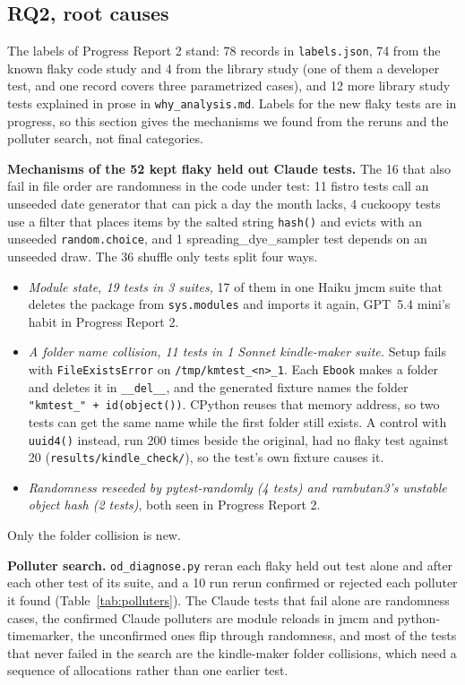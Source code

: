 \subsection{RQ2, root causes}
\label{sec:rootcause3}
The labels of Progress Report 2 stand: 78 records in \texttt{labels.json}, 74 from the known flaky code study and 4 from the library study (one of them a developer test, and one record covers three parametrized cases), and 12 more library study tests explained in prose in \texttt{why\_analysis.md}. Labels for the new flaky tests are in progress, so this section gives the mechanisms we found from the reruns and the polluter search, not final categories.

\textbf{Mechanisms of the 52 kept flaky held out Claude tests.} The 16 that also fail in file order are randomness in the code under test: 11 fistro tests call an unseeded date generator that can pick a day the month lacks, 4 cuckoopy tests use a filter that places items by the salted string \texttt{hash()} and evicts with an unseeded \texttt{random.choice}, and 1 spreading\_dye\_sampler test depends on an unseeded draw. The 36 shuffle only tests split four ways.
\begin{itemize}
\item \emph{Module state, 19 tests in 3 suites,} 17 of them in one Haiku jmcm suite that deletes the package from \texttt{sys.modules} and imports it again, GPT~5.4 mini's habit in Progress Report 2.
\item \emph{A folder name collision, 11 tests in 1 Sonnet kindle-maker suite.} Setup fails with \texttt{FileExistsError} on \texttt{/tmp/kmtest\_<n>\_1}. Each \texttt{Ebook} makes a folder and deletes it in \texttt{\_\_del\_\_}, and the generated fixture names the folder \texttt{"kmtest\_" + id(object())}. CPython reuses that memory address, so two tests can get the same name while the first folder still exists. A control with \texttt{uuid4()} instead, run 200 times beside the original, had no flaky test against 20 (\texttt{results/kindle\_check/}), so the test's own fixture causes it.
\item \emph{Randomness reseeded by pytest-randomly (4 tests) and rambutan3's unstable object hash (2 tests)}, both seen in Progress Report 2.
\end{itemize}
Only the folder collision is new.

\textbf{Polluter search.} \texttt{od\_diagnose.py} reran each flaky held out test alone and after each other test of its suite, and a 10 run rerun confirmed or rejected each polluter it found (Table~\ref{tab:polluters}). The Claude tests that fail alone are randomness cases, the confirmed Claude polluters are module reloads in jmcm and python-timemarker, the unconfirmed ones flip through randomness, and most of the tests that never failed in the search are the kindle-maker folder collisions, which need a sequence of allocations rather than one earlier test.

